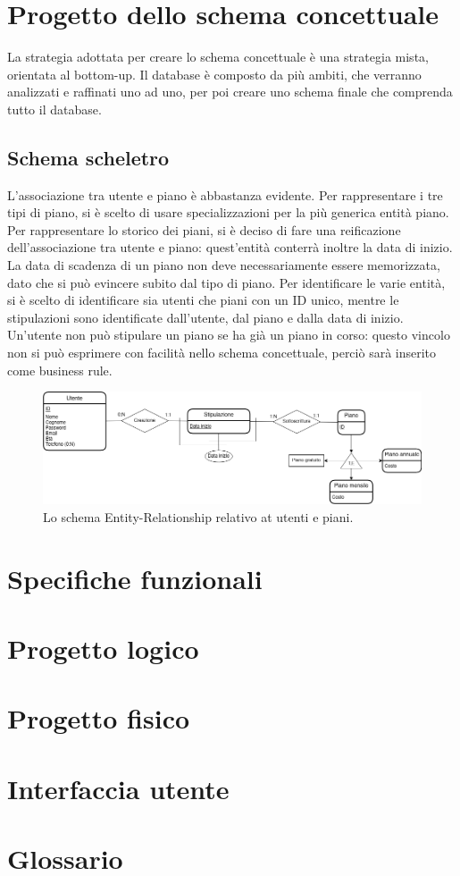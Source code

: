 \documentclass[a4paper,12pt]{report}
\begin{document}
\chapter{Progetto dello schema concettuale}

La strategia adottata per creare lo schema concettuale è una strategia mista, orientata al bottom-up. Il database è composto da più ambiti, che verranno analizzati e raffinati uno ad uno, per poi creare uno schema finale che comprenda tutto il database.

\section{Schema scheletro}

L'associazione tra utente e piano è abbastanza evidente. Per rappresentare i tre tipi di piano, si è scelto di usare specializzazioni per la più generica entità piano. Per rappresentare lo storico dei piani, si è deciso di fare una reificazione dell'associazione tra utente e piano: quest'entità conterrà inoltre la data di inizio. La data di scadenza di un piano non deve necessariamente essere memorizzata, dato che si può evincere subito dal tipo di piano. Per identificare le varie entità, si è scelto di identificare sia utenti che piani con un ID unico, mentre le stipulazioni sono identificate dall'utente, dal piano e dalla data di inizio. Un'utente non può stipulare un piano se ha già un piano in corso: questo vincolo non si può esprimere con facilità nello schema concettuale, perciò sarà inserito come business rule.

\begin{figure}[h]
\centering{}
\includegraphics[width=\textwidth]{piani.png}
\caption{Lo schema Entity-Relationship relativo at utenti e piani.}
\label{img:mainuml}
\end{figure}



\chapter{Specifiche funzionali}

\chapter{Progetto logico}

\chapter{Progetto fisico}

\chapter{Interfaccia utente}

\chapter{Glossario}
\end{document}
